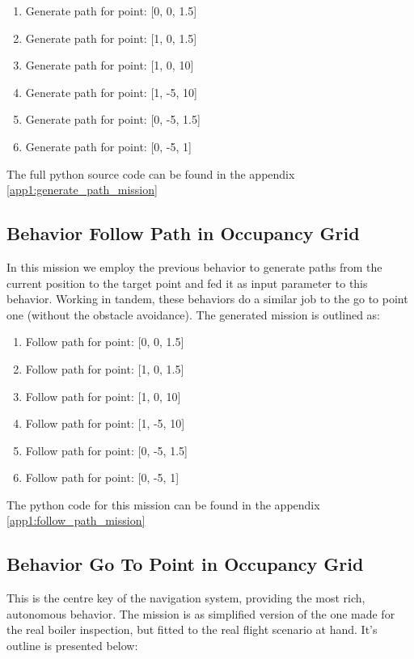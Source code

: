     \begin{enumerate}
      \item Generate path for point: [0, 0, 1.5]
      \item Generate path for point: [1, 0, 1.5]
      \item Generate path for point: [1, 0, 10]
      \item Generate path for point: [1, -5, 10]
      \item Generate path for point: [0, -5, 1.5]
      \item Generate path for point: [0, -5, 1]
    \end{enumerate}

    The full python source code can be found in the appendix \ref{app1:generate_path_mission}

  \subsection{Behavior Follow Path in Occupancy Grid} \label{ch_5:subsect:behav_fpath_mission}

  In this mission we employ the previous behavior to generate paths from the current position to the target point and fed it as input parameter to this behavior. Working in tandem, these behaviors do a similar job to the go to point one (without the obstacle avoidance). The generated mission is outlined as:

    \begin{enumerate}
      \item Follow path for point: [0, 0, 1.5]
      \item Follow path for point: [1, 0, 1.5]
      \item Follow path for point: [1, 0, 10]
      \item Follow path for point: [1, -5, 10]
      \item Follow path for point: [0, -5, 1.5]
      \item Follow path for point: [0, -5, 1]
    \end{enumerate}

    The python code for this mission can be found in the appendix \ref{app1:follow_path_mission}

  \subsection{Behavior Go To Point in Occupancy Grid} \label{ch_5:subsect:behav_gtp_mission}

    This is the centre key of the navigation system, providing the most rich, autonomous behavior. The mission is as simplified version of the one made for the real boiler inspection, but fitted to the real flight scenario at hand. It's outline is presented below:

